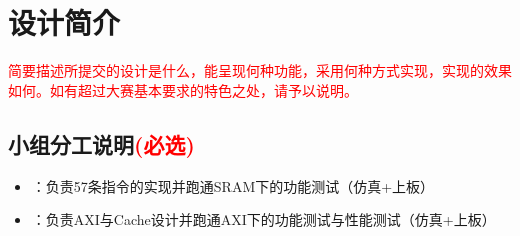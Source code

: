 \section{设计简介}
\textcolor{red}{简要描述所提交的设计是什么，能呈现何种功能，采用何种方式实现，实现的效果如何。如有超过大赛基本要求的特色之处，请予以说明。}



\subsection{小组分工说明\textcolor{red}{(必选)}}

\begin{itemize}
    \item \stunamea：负责57条指令的实现并跑通SRAM下的功能测试（仿真+上板）
    \item \stunameb：负责AXI与Cache设计并跑通AXI下的功能测试与性能测试（仿真+上板）
\end{itemize}